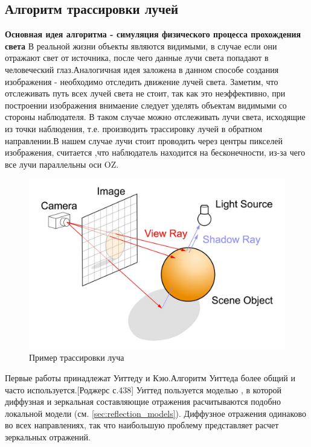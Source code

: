 \documentclass[a4paper,14pt, unknownkeysallowed]{extreport}
\begin{document}
\subsection{Алгоритм трассировки лучей}
\label{sec:ray_tracing}
\textbf{Основная идея алгоритма - симуляция физического процесса прохождения света} \newline
В реальной жизни объекты являются видимыми, в случае если они отражают свет от источника, после чего данные лучи света попадают в человеческий глаз.Аналогичная идея заложена в данном способе создания изображения - необходимо отследить движение лучей света.
Заметим, что отслеживать путь всех лучей света не стоит, так как это неэффективно, при построении изображения внимаение следует уделять объектам видимыми со стороны наблюдателя.
В таком случае можно отслеживать лучи света, исходящие из точки наблюдения, т.е. производить трассировку лучей в обратном направлении.В нашем случае лучи стоит проводить через центры пикселей изображения,
считается ,что наблюдатель находится на бесконечности, из-за чего все лучи параллельны оси OZ.\cite{Rodgers,modern_ray_tracing}

\begin{figure}[h]
	\centering
	\includegraphics[scale=0.4]{ray_tracing.jpg}
	\caption{Пример трассировки луча}
	\label{fig:alg_ray_tracing}
\end{figure} 

Первые работы принадлежат Уиттеду и Кэю.Алгоритм Уиттеда более общий и часто используется.[Роджерс с.438]
Уиттед пользуется моделью , в которой диффузная и зеркальная составляющие отражения расчитываются подобно локальной модели (см. \ref{sec:reflection_models}).
Диффузное отражения одинаково во всех направлениях, так что наибольшую проблему представляет расчет зеркальных отражений.\cite{Rodgers}
\end{document}
